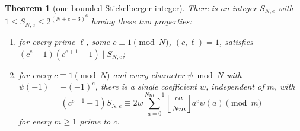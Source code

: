 \documentclass[11pt,a4paper]{article}
\newtheorem{theorem}{Theorem}[section]
\theoremstyle{definition}
\begin{document}
\begin{theorem}[one bounded Stickelberger integer]
\label{thm:stick-integer}
There is an integer \(S_{N,e}\) with
\(1\le S_{N,e}\le2^{(N+e+3)^6}\) having these
two properties:
\begin{enumerate}[label=(\roman*)]
\item for every prime \(\ell\), some \(c\equiv1\pmod N\),
\((c,\ell)=1\), satisfies
\((c^e-1)(c^{e+1}-1)\mid S_{N,e}\);
\item for every \(c\equiv1\pmod N\) and every
character \(\psi\bmod N\) with
\(\psi(-1)=-(-1)^e\), there is a single
coefficient \(w\), independent of \(m\), with
\[
 (c^{e+1}-1)S_{N,e}
 \equiv 2w\sum_{a=0}^{Nm-1}
       \left\lfloor\frac{ca}{Nm}\right\rfloor
                              a^e\psi(a)\pmod m
\]
for every \(m\ge1\) prime to \(c\).
\end{enumerate}
\end{theorem}
\end{document}
